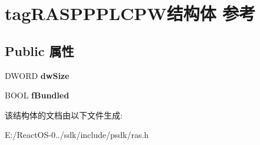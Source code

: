 \hypertarget{structtag_r_a_s_p_p_p_l_c_p_w}{}\section{tag\+R\+A\+S\+P\+P\+P\+L\+C\+P\+W结构体 参考}
\label{structtag_r_a_s_p_p_p_l_c_p_w}
\subsection*{Public 属性}
\begin{DoxyCompactItemize}
\item 
\mbox{\label{structtag_r_a_s_p_p_p_l_c_p_w_a5f49098f63863eefe018df4270e43f56}} 
D\+W\+O\+RD {\bfseries dw\+Size}
\item 
\mbox{\label{structtag_r_a_s_p_p_p_l_c_p_w_a878e5751ee95713709d4c6241a0cee1d}} 
B\+O\+OL {\bfseries f\+Bundled}
\end{DoxyCompactItemize}


该结构体的文档由以下文件生成\+:\begin{DoxyCompactItemize}
\item 
E\+:/\+React\+O\+S-\/0../sdk/include/psdk/ras.\+h\end{DoxyCompactItemize}
